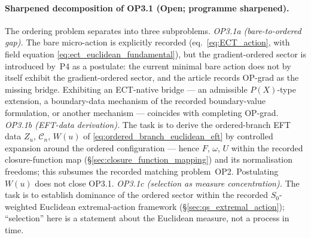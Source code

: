 


\paragraph{Sharpened decomposition of OP3.1 (Open; programme
sharpened).}
The ordering problem separates into three subproblems.
\emph{OP3.1a (bare-to-ordered gap).}
The bare micro-action is explicitly recorded
(eq.~\eqref{eq:ECT_action}, with field equation
\eqref{eq:ect_euclidean_fundamental}), but the gradient-ordered
sector is introduced by~P4 as a postulate: the current minimal
bare action does not by itself exhibit the gradient-ordered
sector, and the article records OP-grad as the missing bridge.
Exhibiting an ECT-native bridge --- an admissible $P(X)$-type
extension, a boundary-data mechanism of the recorded
boundary-value formulation, or another mechanism --- coincides
with completing OP-grad.
\emph{OP3.1b (EFT-data derivation).}
The task is to derive the ordered-branch EFT data $Z_u$,
$\mathcal C_n$, $W(u)$
of \eqref{eq:ordered_branch_euclidean_eft} by controlled expansion
around the ordered configuration --- hence $F$, $\omega$, $U$
within the recorded closure-function map
(\S\ref{sec:closure_function_mapping}) and its normalisation
freedoms; this subsumes the recorded matching problem~OP2.
Postulating $W(u)$ does not close OP3.1.
\emph{OP3.1c (selection as measure concentration).}
The task is to establish dominance of the ordered sector within
the recorded
$S_0$-weighted Euclidean extremal-action framework
(\S\ref{sec:qs_extremal_action}); ``selection'' here is a
statement about the Euclidean measure, not a process in time.


